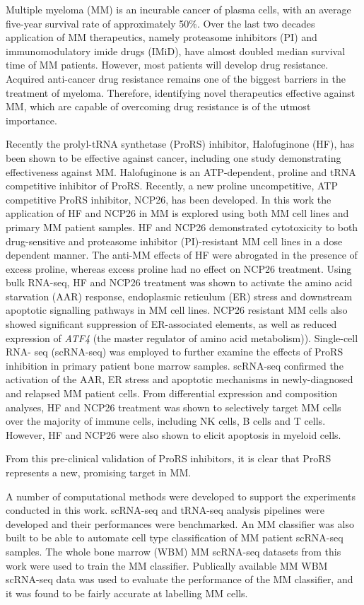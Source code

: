 
Multiple myeloma (MM) is an incurable cancer of plasma cells, with an average five-year survival rate of approximately 50\%.
Over the last two decades application of MM therapeutics, namely proteasome inhibitors (PI) and immunomodulatory imide drugs (IMiD), have almost doubled median survival time of MM patients.
However, most patients will develop drug resistance.
Acquired anti-cancer drug resistance remains one of the biggest barriers in the treatment of myeloma.
Therefore, identifying novel therapeutics effective against MM, which are capable of overcoming drug resistance is of the utmost importance.

Recently the prolyl-tRNA synthetase (ProRS) inhibitor, Halofuginone (HF), has been shown to be effective against cancer, including one study demonstrating effectiveness against MM\@.
Halofuginone is an ATP-dependent, proline and tRNA competitive inhibitor of ProRS\@.
Recently, a new proline uncompetitive, ATP competitive ProRS inhibitor, NCP26, has been developed.
In this work the application of HF and NCP26 in MM is explored using both MM cell lines and primary MM patient samples.
HF and NCP26 demonstrated cytotoxicity to both drug-sensitive and proteasome inhibitor (PI)-resistant MM cell lines in a dose dependent manner.
The anti-MM effects of HF were abrogated in the presence of excess proline, whereas excess proline had no effect on NCP26 treatment.
Using bulk RNA-seq, HF and NCP26 treatment was shown to activate the amino acid starvation (AAR) response, endoplasmic reticulum (ER) stress and downstream apoptotic signalling pathways in MM cell lines.
NCP26 resistant MM cells also showed significant suppression of ER-associated elements, as well as reduced expression of \textit{ATF4} (the master regulator of amino acid metabolism)).
Single-cell RNA- seq (scRNA-seq) was employed to further examine the effects of ProRS inhibition in primary patient bone marrow samples.
scRNA-seq confirmed the activation of the AAR, ER stress and apoptotic mechanisms in newly-diagnosed and relapsed MM patient cells.
From differential expression and composition analyses, HF and NCP26 treatment was shown to selectively target MM cells over the majority of immune cells, including NK cells, B cells and T cells.
However, HF and NCP26 were also shown to elicit apoptosis in myeloid cells.

From this pre-clinical validation of ProRS inhibitors, it is clear that ProRS represents a new, promising target in MM\@.

A number of computational methods were developed to support the experiments conducted in this work.
scRNA-seq and tRNA-seq analysis pipelines were developed and their performances were benchmarked.
An MM classifier was also built to be able to automate cell type classification of MM patient scRNA-seq samples.
The whole bone marrow (WBM) MM scRNA-seq datasets from this work were used to train the MM classifier.
Publically available MM WBM scRNA-seq data was used to evaluate the performance of the MM classifier, and it was found to be fairly accurate at labelling MM cells.


